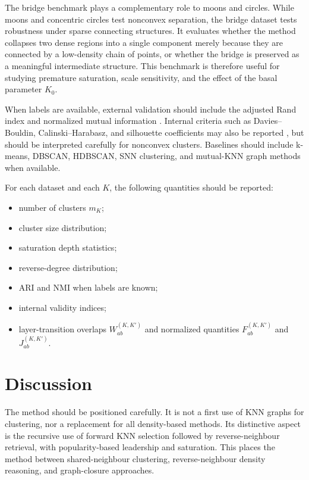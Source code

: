 \documentclass[pdflatex,sn-mathphys-num]{sn-jnl}
\begin{document}
The bridge benchmark plays a complementary role to moons and circles. While moons and concentric circles test nonconvex separation, the bridge dataset tests robustness under sparse connecting structures. It evaluates whether the method collapses two dense regions into a single component merely because they are connected by a low-density chain of points, or whether the bridge is preserved as a meaningful intermediate structure. This benchmark is therefore useful for studying premature saturation, scale sensitivity, and the effect of the basal parameter $K_0$.

When labels are available, external validation should include the adjusted Rand index and normalized mutual information \citep{HubertArabie1985,VinhEppsBailey2010}. Internal criteria such as Davies--Bouldin, Calinski--Harabasz, and silhouette coefficients may also be reported \citep{DaviesBouldin1979,CalinskiHarabasz1974,Rousseeuw1987}, but should be interpreted carefully for nonconvex clusters. Baselines should include k-means, DBSCAN, HDBSCAN, SNN clustering, and mutual-KNN graph methods when available.

For each dataset and each $K$, the following quantities should be reported:
\begin{itemize}
    \item number of clusters $m_K$;
    \item cluster size distribution;
    \item saturation depth statistics;
    \item reverse-degree distribution;
    \item ARI and NMI when labels are known;
    \item internal validity indices;
    \item layer-transition overlaps $W_{ab}^{(K,K')}$ and normalized quantities $F_{ab}^{(K,K')}$ and $J_{ab}^{(K,K')}$.
\end{itemize}

\section{Discussion}\label{sec:discussion}

The method should be positioned carefully. It is not a first use of KNN graphs for clustering, nor a replacement for all density-based methods. Its distinctive aspect is the recursive use of forward KNN selection followed by reverse-neighbour retrieval, with popularity-based leadership and saturation. This places the method between shared-neighbour clustering, reverse-neighbour density reasoning, and graph-closure approaches.
\end{document}
